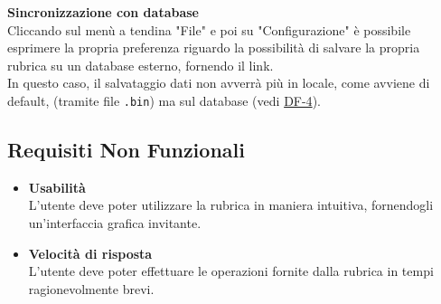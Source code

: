 \begin{tcolorbox}[colback=white,colframe=black!80!white,title=\textbf{Interfacce con sistemi esterni IS}]
	\begin{itemize}[itemsep=2pt, topsep=0pt]
		\hypertarget{IS-1}{\item[\textbf{IS-1}]} \textbf{Sincronizzazione con database}
		\\Cliccando sul menù a tendina "File" e poi su "Configurazione" è possibile esprimere la propria preferenza riguardo la possibilità di salvare la propria rubrica su un database esterno, fornendo il link. 
		\\In questo caso, il salvataggio dati non avverrà più in locale, come avviene di default, (tramite file \texttt{.bin}) ma sul database (vedi \hyperlink{DF-4}{DF-4}).
	\end{itemize}
\end{tcolorbox}


\subsection{Requisiti Non Funzionali}
\begin{tcolorbox}[colback=white,colframe=black!80!white,title=\textbf{Vincoli FC}]
	\begin{itemize}[itemsep=2pt, topsep=0pt]
		\item[\textbf{FC-1}] \textbf{Usabilità}
		\\L’utente deve poter utilizzare la rubrica in maniera intuitiva, fornendogli un’interfaccia grafica invitante.
		
		\item[\textbf{FC-2}] \textbf{Velocità di risposta}
		\\L’utente deve poter effettuare le operazioni fornite dalla rubrica in tempi ragionevolmente brevi.		
	\end{itemize}
\end{tcolorbox}


\newpage
